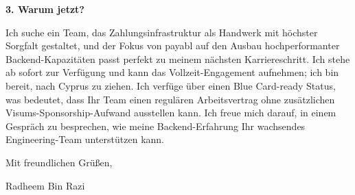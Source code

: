 \documentclass[11pt,a4paper]{coverletter}
\begin{document}
\vspace{8pt}\noindent\textbf{3. Warum jetzt?}\par\vspace{3pt}

Ich suche ein Team, das Zahlungsinfrastruktur als Handwerk mit höchster Sorgfalt gestaltet, und der Fokus von payabl auf den Ausbau hochperformanter Backend-Kapazitäten passt perfekt zu meinem nächsten Karriereschritt. Ich stehe ab sofort zur Verfügung und kann das Vollzeit-Engagement aufnehmen; ich bin bereit, nach Cyprus zu ziehen. Ich verfüge über einen Blue Card-ready Status, was bedeutet, dass Ihr Team einen regulären Arbeitsvertrag ohne zusätzlichen Visums-Sponsorship-Aufwand ausstellen kann. Ich freue mich darauf, in einem Gespräch zu besprechen, wie meine Backend-Erfahrung Ihr wachsendes Engineering-Team unterstützen kann.

\closing{Mit freundlichen Grüßen,}{Radheem Bin Razi}
\end{document}
